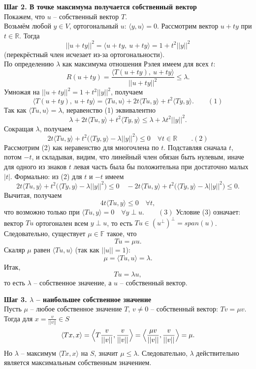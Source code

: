 \documentclass[14pt]{extreport}
\begin{document}
\begin{prbox}
        \textbf{Шаг 2. В точке максимума получается собственный вектор}\\
        Покажем, что $u$ – собственный вектор $T$.\\
        Возьмём любой $y \in V$, ортогональный $u$: $\langle y,u \rangle = 0$. Рассмотрим вектор $u + ty$ при $t \in \mathbb{R}$. Тогда
        \[
        ||u + ty||^2 = \langle u+ty,\ u+ty \rangle = 1 + t^2 ||y||^2
        \]
        (перекрёстный член исчезает из-за ортогональности).\\
        По определению $\lambda$ как максимума отношения Рэлея имеем для всех $t$:
        \[
        R(u + ty) = \frac{\langle T(u+ty),\ u+ty \rangle}{||u+ty||^2} \leq \lambda.
        \]
        Умножая на $||u+ty||^2 = 1 + t^2||y||^2$, получаем
        \[
        \langle T(u+ty),\ u+ty \rangle = \langle Tu,u \rangle + 2t \langle Tu,y \rangle + t^2 \langle Ty,y \rangle. \qquad (1)
        \]
        Так как $\langle Tu,u \rangle = \lambda$, неравенство (1) эквивалентно
        \[
        \lambda + 2t \langle Tu,y \rangle + t^2 \langle Ty,y \rangle \leq \lambda + \lambda t^2 ||y||^2.
        \]
        Сокращая $\lambda$, получаем
        \[
        2t \langle Tu,y \rangle + t^2 \bigl( \langle Ty,y \rangle - \lambda||y||^2 \bigr) \leq 0 \quad \forall t \in \mathbb{R} \qquad. (2)
        \]
        Рассмотрим (2) как неравенство для многочлена по $t$. Подставляя сначала $t$, потом $-t$, и складывая, видим, что линейный член обязан быть нулевым, иначе для одного из знаков $t$ левая часть была бы положительна при достаточно малых $|t|$. Формально: из (2) для $t$ и $-t$ имеем
        \[
        2t \langle Tu,y \rangle + t^2 \bigl( \langle Ty,y \rangle - \lambda||y||^2 \bigr) \leq 0 \quad -2t \langle Tu,y \rangle + t^2 \bigl( \langle Ty,y \rangle - \lambda||y||^2 \bigr) \leq 0.
        \]
        Вычитая, получаем
        \[
        4t \langle Tu,y \rangle \leq 0 \quad \forall t,
        \]
        что возможно только при $\langle Tu,y \rangle = 0 \quad \forall y \perp u. \qquad (3)$
        Условие (3) означает: вектор $Tu$ ортогонален всем $y \perp u$, то есть $Tu \in (u^\perp)^\perp = span(u)$. Следовательно, существует $\mu \in \mathbb{F}$ такое, что
        \[
        Tu = \mu u.
        \]
        Скаляр $\mu$ равен $\langle Tu,u \rangle$ (так как $||u||=1$):
        \[
        \mu = \langle Tu,u \rangle = \lambda.
        \]
        Итак,
        \[
        Tu = \lambda u,
        \]
        то есть $\lambda$ – собственное значение, а $u$ – собственный вектор.

        \textbf{Шаг 3. $\lambda$ – наибольшее собственное значение}\\
        Пусть $\mu$ – любое собственное значение $T$, $v \neq 0$ – собственный вектор: $Tv = \mu v$. Тогда для $x = \frac{v}{||v||} \in S$
        \[
        \langle Tx,x \rangle = \Bigl\langle T\frac{v}{||v||}, \frac{v}{||v||} \Bigr\rangle = \Bigl\langle \frac{\mu v}{||v||}, \frac{v}{||v||} \Bigr\rangle = \mu.
        \]
        Но $\lambda$ – максимум $\langle Tx,x \rangle$ на $S$, значит $\mu \leq \lambda$. Следовательно, $\lambda$ действительно является максимальным собственным значением.
    \end{prbox}
\end{document}
